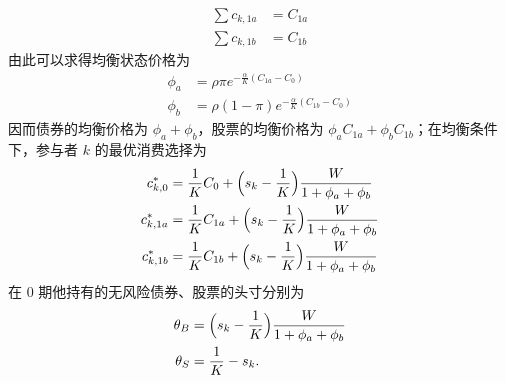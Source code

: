 \begin{solution}
\begin{enumerate}[label=(\alph*)]
\[\begin{aligned}
            \sum c_{k,1a}&=C_{1a}\\
            \sum c_{k,1b}&=C_{1b}
        \end{aligned}
    \]
    由此可以求得均衡状态价格为
    \[
        \begin{aligned}
            \phi_{a}&=\rho\pi e^{-\frac{\alpha}{K}(C_{1a}-C_{0})}\\
            \phi_{b}&=\rho(1-\pi)e^{-\frac{\alpha}{K}(C_{1b}-C_{0})}
        \end{aligned}
    \]
    因而债券的均衡价格为 $\phi_{a}+\phi_{b}$，股票的均衡价格为 $\phi_{a}C_{1a}+\phi_{b}C_{1b}$；在均衡条件下，参与者 $k$ 的最优消费选择为
    \[
        \begin{aligned}
            c_{k,0}^{*}&=\frac{1}{K}C_{0}+\Bigl(s_{k}-\frac{1}{K}\Bigr)\frac{W}{1+\phi_{a}+\phi_{b}}\\
            c_{k,1a}^{*}&=\frac{1}{K}C_{1a}+\Bigl(s_{k}-\frac{1}{K}\Bigr)\frac{W}{1+\phi_{a}+\phi_{b}}\\
            c_{k,1b}^{*}&=\frac{1}{K}C_{1b}+\Bigl(s_{k}-\frac{1}{K}\Bigr)\frac{W}{1+\phi_{a}+\phi_{b}}
        \end{aligned}
    \]
    在 0 期他持有的无风险债券、股票的头寸分别为
    \[
        \begin{aligned}
            \theta_{B}&=\Bigl(s_{k}-\frac{1}{K}\Bigr)\frac{W}{1+\phi_{a}+\phi_{b}}\\
            \theta_{S}&=\frac{1}{K}-s_{k}.
        \end{aligned}
    \]
\end{enumerate}
\end{solution}

